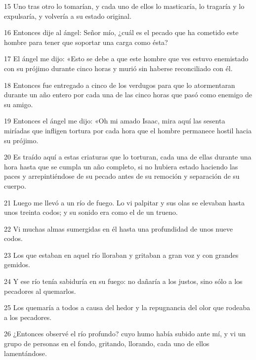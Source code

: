 \par 15 Uno tras otro lo tomarían, y cada uno de ellos lo masticaría, lo tragaría y lo expulsaría, y volvería a su estado original.

\par 16 Entonces dije al ángel: Señor mío, ¿cuál es el pecado que ha cometido este hombre para tener que soportar una carga como ésta?

\par 17 El ángel me dijo: «Esto se debe a que este hombre que ves estuvo enemistado con su prójimo durante cinco horas y murió sin haberse reconciliado con él.

\par 18 Entonces fue entregado a cinco de los verdugos para que lo atormentaran durante un año entero por cada una de las cinco horas que pasó como enemigo de su amigo.

\par 19 Entonces el ángel me dijo: «Oh mi amado Isaac, mira aquí las sesenta miríadas que infligen tortura por cada hora que el hombre permanece hostil hacia su prójimo.

\par 20 Es traído aquí a estas criaturas que lo torturan, cada una de ellas durante una hora hasta que se cumpla un año completo, si no hubiera estado haciendo las paces y arrepintiéndose de su pecado antes de su remoción y separación de su cuerpo.

\par 21 Luego me llevó a un río de fuego. Lo vi palpitar y sus olas se elevaban hasta unos treinta codos; y su sonido era como el de un trueno.

\par 22 Vi muchas almas sumergidas en él hasta una profundidad de unos nueve codos.

\par 23 Los que estaban en aquel río lloraban y gritaban a gran voz y con grandes gemidos.

\par 24 Y ese río tenía sabiduría en su fuego: no dañaría a los justos, sino sólo a los pecadores al quemarlos.

\par 25 Los quemaría a todos a causa del hedor y la repugnancia del olor que rodeaba a los pecadores.

\par 26 ¿Entonces observé el río profundo? cuyo humo había subido ante mí, y vi un grupo de personas en el fondo, gritando, llorando, cada uno de ellos lamentándose.

